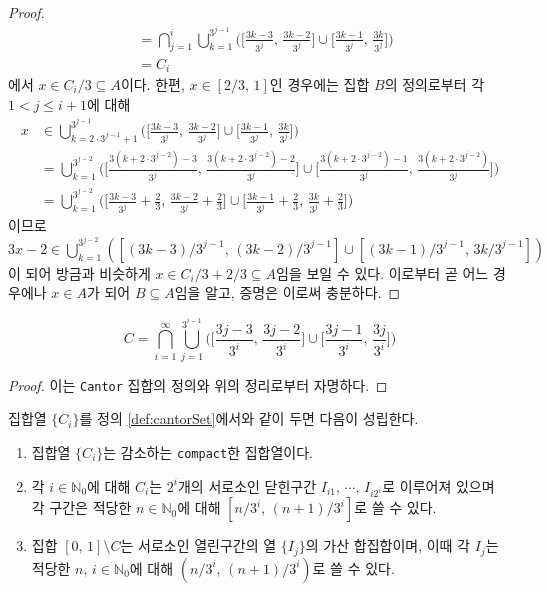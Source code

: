 \begin{proof}
\begin{align*}
        &=\bigcap_{j=1}^i\bigcup_{k=1}^{3^{j-1}}\bigg(\bigg[\frac{3k-3}{3^j},\,\frac{3k-2}{3^j}\bigg]\cup\bigg[\frac{3k-1}{3^j},\,\frac{3k}{3^j}\bigg]\bigg)\\
        &=C_i
    \end{align*}
    에서 $x\in C_i/3\subseteq A$이다. 한편, $x\in[2/3,\,1]$인 경우에는 집합 $B$의 정의로부터 각 $1<j\leq i+1$에 대해
    \begin{align*}
        x&\in\bigcup_{k=2\cdot3^{j-1}+1}^{3^{j-1}}\bigg(\bigg[\frac{3k-3}{3^j},\,\frac{3k-2}{3^j}\bigg]\cup\bigg[\frac{3k-1}{3^j},\,\frac{3k}{3^j}\bigg]\bigg)\\
        &=\bigcup_{k=1}^{3^{j-2}}\bigg(\bigg[\frac{3(k+2\cdot3^{j-2})-3}{3^j},\,\frac{3(k+2\cdot3^{j-2})-2}{3^j}\bigg]\cup\bigg[\frac{3(k+2\cdot3^{j-2})-1}{3^j},\,\frac{3(k+2\cdot3^{j-2})}{3^j}\bigg]\bigg)\\
        &=\bigcup_{k=1}^{3^{j-2}}\bigg(\bigg[\frac{3k-3}{3^j}+\frac{2}{3},\,\frac{3k-2}{3^j}+\frac{2}{3}\bigg]\cup\bigg[\frac{3k-1}{3^j}+\frac{2}{3},\,\frac{3k}{3^j}+\frac{2}{3}\bigg]\bigg)
    \end{align*}
    이므로 $3x-2\in\bigcup_{k=1}^{3^{j-2}}([(3k-3)/3^{j-1},\,(3k-2)/3^{j-1}]\cup[(3k-1)/3^{j-1},\,3k/3^{j-1}])$이 되어 방금과 비슷하게 $x\in C_i/3+2/3\subseteq A$임을 보일 수 있다. 이로부터 곧 어느 경우에나 $x\in A$가 되어 $B\subseteq A$임을 알고, 증명은 이로써 충분하다.
\end{proof}

\begin{corollary}
    \begin{equation*}
        C=\bigcap_{i=1}^\infty\bigcup_{j=1}^{3^{i-1}}\bigg(\bigg[\frac{3j-3}{3^i},\,\frac{3j-2}{3^i}\bigg]\cup\bigg[\frac{3j-1}{3^i},\,\frac{3j}{3^i}\bigg]\bigg)
    \end{equation*}
\end{corollary}

\begin{proof}
    이는 \texttt{Cantor} 집합의 정의와 위의 정리로부터 자명하다.
\end{proof}

\begin{proposition}\label{prop:cantorSet}
    집합열 $\{C_i\}$를 정의 \ref{def:cantorSet}에서와 같이 두면 다음이 성립한다.
    \begin{enumerate}
        \item 집합열 $\{C_i\}$는 감소하는 \texttt{compact}한 집합열이다.
        \item 각 $i\in\mathbb{N}_0$에 대해 $C_i$는 $2^i$개의 서로소인 닫힌구간 $I_{i1},\,\cdots,\,I_{i2^i}$로 이루어져 있으며 각 구간은 적당한 $n\in\mathbb{N}_0$에 대해 $[n/3^i,\,(n+1)/3^i]$로 쓸 수 있다.
        \item 집합 $[0,\,1]\setminus C$는 서로소인 열린구간의 열 $\{I_j\}$의 가산 합집합이며, 이때 각 $I_j$는 적당한 $n,\,i\in\mathbb{N}_0$에 대해 $(n/3^i,\,(n+1)/3^i)$로 쓸 수 있다.
    \end{enumerate}
\end{proposition}

